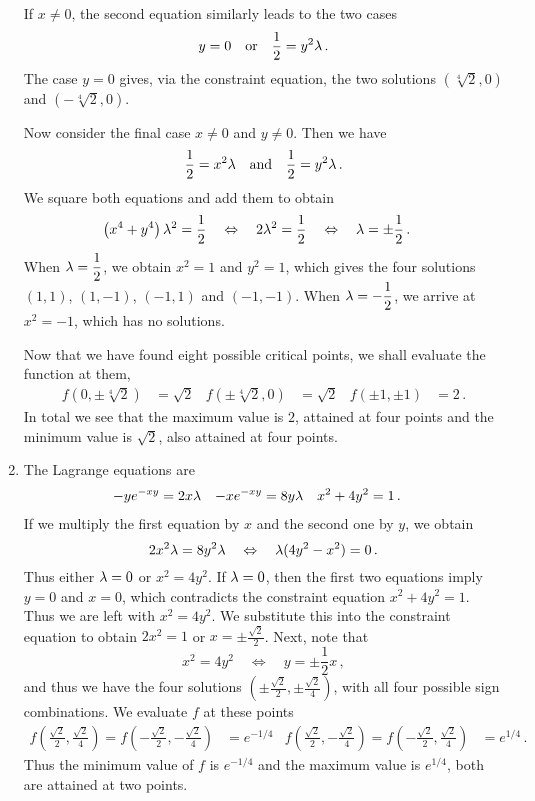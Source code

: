 \begin{solution}
\begin{enumerate}
If $x \neq 0$, the second equation similarly leads to the two cases
\[
y=0 \quad\text{or}\quad
\frac 12 = y^2 \lambda\,.
\]
The case $y=0$ gives, via the constraint equation, the two solutions $\left(\sqrt[4] 2, 0\right)$ and $\left(-\sqrt[4] 2, 0\right)$.

Now consider the final case $x \neq 0$ and $y \neq 0$. Then we have
\[
\frac 12 = x^2 \lambda 
\quad\text{and}\quad
\frac 12 = y^2 \lambda\,.
\]
We square both equations and add them to obtain
\begin{align*}
\left(x^4 + y^4 \right) \lambda^2 &= \frac 12 \quad\Leftrightarrow\quad
2 \lambda^2 = \frac 12 \quad\Leftrightarrow\quad
\lambda = \pm \frac 12\,.
\end{align*}
When $\lambda = \displaystyle \frac 12$, we obtain $x^2 = 1$ and $y^2=1$, which gives the four solutions $(1,1)$, $(1,-1)$, $(-1,1)$ and $(-1,-1)$. When $\lambda = \displaystyle -\frac 12$, we arrive at $x^2 = -1$, which has no solutions. 

Now that we have found eight possible critical points, we shall evaluate the function at them,
\begin{align*}
f\left(0, \pm\sqrt[4] 2\right) &= \sqrt{2} &
f\left(\pm\sqrt[4] 2, 0\right) &= \sqrt{2} &
f(\pm 1, \pm 1) &= 2\,.
\end{align*}
In total we see that the maximum value is $2$, attained at four points and the minimum value is $\sqrt{2}$, also attained at four points.

\item
The Lagrange equations are
\begin{align*}
-y e^{-xy} &= 2x\lambda &
-x e^{-xy} &= 8y\lambda &
x^2 + 4y^2 &= 1\,.
\end{align*}
If we multiply the first equation by $x$ and the second one by $y$, we obtain
\[
2x^2\lambda = 8y^2 \lambda
\quad\Leftrightarrow\quad
\lambda(4y^2 - x^2) = 0\,.
\]
Thus either $\lambda = 0$ or $x^2 = 4y^2$. If $\lambda = 0$, then the first two equations imply $y=0$ and $x=0$, which contradicts the constraint equation $x^2 + 4y^2 = 1$. Thus we are left with $x^2 = 4y^2$. We substitute this into the constraint equation to obtain $2x^2 = 1$ or $x = \pm \frac{\sqrt 2}{2}$. Next, note that
\[
x^2 = 4y^2
\quad\Leftrightarrow\quad
y = \pm \frac 12 x\,,
\]
and thus we have the four solutions 
$\left( \pm \frac{\sqrt 2}{2}, \pm \frac{\sqrt 2}{4} \right)$, with all four possible sign combinations. We evaluate $f$ at these points
\begin{align*}
f\left( \frac{\sqrt 2}{2}, \frac{\sqrt 2}{4} \right)
= f\left( -\frac{\sqrt 2}{2}, -\frac{\sqrt 2}{4} \right) 
&= e^{-1/4} &
f\left( \frac{\sqrt 2}{2}, -\frac{\sqrt 2}{4} \right)
= f\left( -\frac{\sqrt 2}{2}, \frac{\sqrt 2}{4} \right) 
&= e^{1/4}\,.
\end{align*}
Thus the minimum value of $f$ is $e^{-1/4}$ and the maximum value is $e^{1/4}$, both are attained at two points.
\end{enumerate}
\end{solution}

